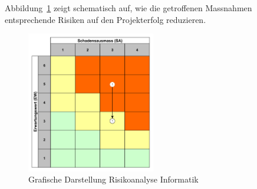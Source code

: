 \documentclass[main.tex]{subfiles} %
\begin{document}
Abbildung~\ref{fig:Diagramm_Risiko_info} zeigt schematisch auf, wie die
getroffenen Massnahmen entsprechende Risiken auf den Projekterfolg reduzieren.

\begin{figure}[h]
    \centering
    \includegraphics[width=0.5\textwidth]{./Risks_Diagramm/Diagramm_Risiko_info.pdf}
    \caption{Grafische Darstellung Risikoanalyse Informatik}
    \label{fig:Diagramm_Risiko_info}
\end{figure}
\end{document}
